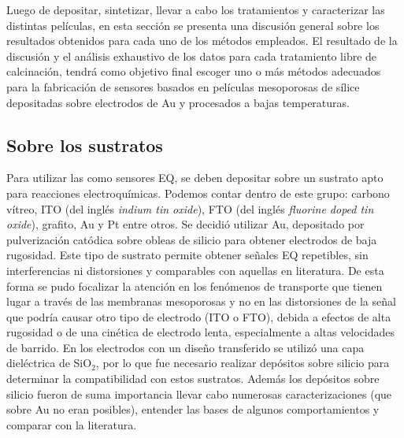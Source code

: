 			Luego de depositar, sintetizar, llevar a cabo los tratamientos y caracterizar las distintas películas, en esta sección se presenta una discusión general sobre los resultados obtenidos para cada uno de los métodos empleados. El resultado de la discusión y el análisis exhaustivo de los datos para cada tratamiento libre de calcinación, tendrá como objetivo final escoger uno o más métodos adecuados para la fabricación de sensores basados en películas mesoporosas de sílice depositadas sobre electrodos de Au y procesados a bajas temperaturas.

	\subsection{Sobre los sustratos}

			Para utilizar las \pdm\space como sensores EQ, se deben depositar sobre un sustrato apto para reacciones electroquímicas. Podemos contar dentro de este grupo: carbono vítreo, ITO (del inglés \textit{indium tin oxide}), FTO (del inglés \textit{fluorine doped tin oxide}), grafito, Au y Pt entre otros.\cite{walcariussss2001,walcarius2013} Se decidió utilizar Au, depositado por pulverización catódica sobre obleas de silicio para obtener electrodos de baja rugosidad. Este tipo de sustrato permite obtener señales EQ repetibles, sin interferencias ni distorsiones y comparables con aquellas en literatura.\cite{Wi2000,Bockris1974} De esta forma se pudo focalizar la atención en los fenómenos de transporte que tienen lugar a través de las membranas mesoporosas y no en las distorsiones de la señal que podría causar otro tipo de electrodo (ITO o FTO), debida a efectos de alta rugosidad o de una cinética de electrodo lenta, especialmente a altas velocidades de barrido.			
		    En los electrodos con un diseño transferido se utilizó una capa dieléctrica de SiO$_2$, por lo que fue necesario realizar depósitos sobre silicio para determinar la compatibilidad con estos sustratos. Además los depósitos sobre silicio fueron de suma importancia llevar cabo numerosas caracterizaciones (que sobre Au no eran posibles), entender las bases de algunos comportamientos y comparar con la literatura.\cite{Innocenzi2013}

